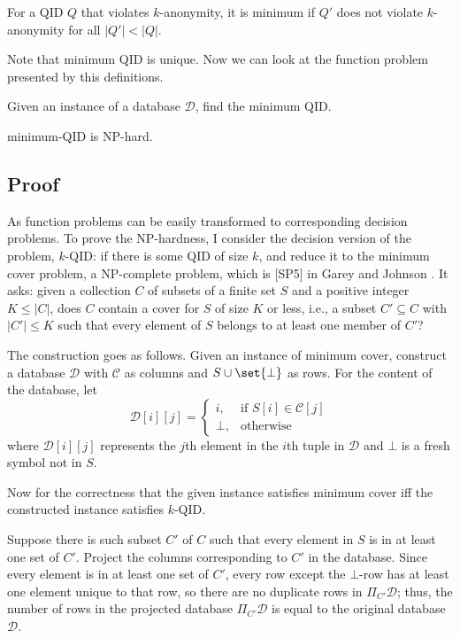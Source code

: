 \documentclass[12pt]{llncs}
\DeclarePairedDelimiter\set\{\}
\newcommand{\cC}{\mathcal{C}}
\newcommand{\cD}{\mathcal{D}}
\newcommand{\Proj}[1]{\Pi_{#1}}
\begin{document}
\begin{definition}
For a QID $Q$ that violates $k$-anonymity, it is minimum if $Q'$ does not violate $k$-anonymity for all $|Q'| < |Q|$.
\end{definition}

Note that minimum QID is unique. Now we can look at the function problem presented by this definitions.

\begin{problem}
Given an instance of a database $\cD$, find the minimum QID.
\end{problem}

\begin{proposition}
minimum-QID is NP-hard.
\end{proposition}

\subsection{Proof}
As function problems can be easily transformed to corresponding decision problems. To prove the NP-hardness, I consider the decision version of the problem, $k$-QID: if there is some QID of size $k$, and reduce it to the minimum cover problem, a NP-complete problem, which is [SP5] in Garey and Johnson \cite{Garey:1990}. It asks: given a collection $C$ of subsets of a finite set $S$ and a positive integer $K \leq |C|$, does $C$ contain a cover for $S$ of size $K$ or less, i.e., a subset $C' \subseteq C$ with $|C'| \leq K$ such that every element of $S$ belongs to at least one member of $C'$?

The construction goes as follows. Given an instance of minimum cover, construct a database $\cD$ with $\cC$ as columns and $S \cup \set{\bot}$ as rows. For the content of the database, let
$$
\cD[i][j] =
\begin{cases}
    i,    &\text{if } S[i] \in \cC[j]\\
    \bot, &\text{otherwise}
\end{cases}
$$
where $\cD[i][j]$ represents the $j$th element in the $i$th tuple in $\cD$ and $\bot$ is a fresh symbol not in $S$.

Now for the correctness that the given instance satisfies minimum cover iff the constructed instance satisfies $k$-QID.

Suppose there is such subset $C'$ of $C$ such that every element in $S$ is in at least one set of $C'$. Project the columns corresponding to $C'$ in the database. Since every element is in at least one set of $C'$, every row except the $\bot$-row has at least one element unique to that row, so there are no duplicate rows in $\Proj{C'} \cD$; thus, the number of rows in the projected database $\Proj{C'} \cD$ is equal to the original database $\cD$.
\end{document}
